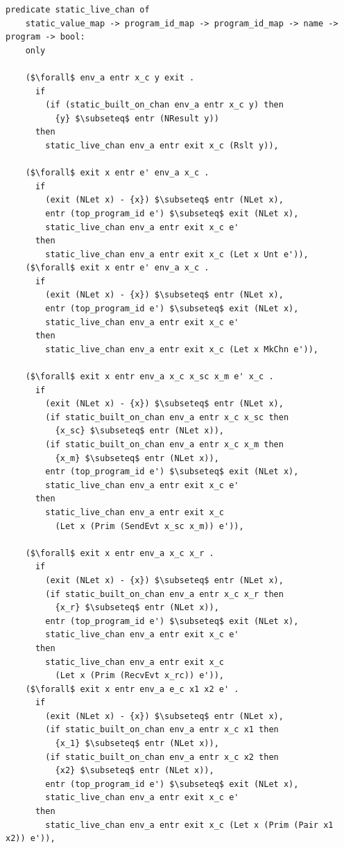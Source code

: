 \documentclass{article}
\begin{document}
\begin{lstlisting}[language=logic, mathescape]
  predicate static_live_chan of
    static_value_map -> program_id_map -> program_id_map -> name -> program -> bool:
    only

    ($\forall$ env_a entr x_c y exit .
      if
        (if (static_built_on_chan env_a entr x_c y) then
          {y} $\subseteq$ entr (NResult y))
      then
        static_live_chan env_a entr exit x_c (Rslt y)),

    ($\forall$ exit x entr e' env_a x_c .
      if 
        (exit (NLet x) - {x}) $\subseteq$ entr (NLet x),
        entr (top_program_id e') $\subseteq$ exit (NLet x),
        static_live_chan env_a entr exit x_c e'
      then 
        static_live_chan env_a entr exit x_c (Let x Unt e')),
    ($\forall$ exit x entr e' env_a x_c .
      if
        (exit (NLet x) - {x}) $\subseteq$ entr (NLet x),
        entr (top_program_id e') $\subseteq$ exit (NLet x),
        static_live_chan env_a entr exit x_c e'
      then 
        static_live_chan env_a entr exit x_c (Let x MkChn e')),

    ($\forall$ exit x entr env_a x_c x_sc x_m e' x_c .
      if
        (exit (NLet x) - {x}) $\subseteq$ entr (NLet x),
        (if static_built_on_chan env_a entr x_c x_sc then
          {x_sc} $\subseteq$ entr (NLet x)),
        (if static_built_on_chan env_a entr x_c x_m then 
          {x_m} $\subseteq$ entr (NLet x)),
        entr (top_program_id e') $\subseteq$ exit (NLet x),
        static_live_chan env_a entr exit x_c e'
      then
        static_live_chan env_a entr exit x_c
          (Let x (Prim (SendEvt x_sc x_m)) e')),

    ($\forall$ exit x entr env_a x_c x_r .    
      if
        (exit (NLet x) - {x}) $\subseteq$ entr (NLet x),
        (if static_built_on_chan env_a entr x_c x_r then
          {x_r} $\subseteq$ entr (NLet x)),
        entr (top_program_id e') $\subseteq$ exit (NLet x),
        static_live_chan env_a entr exit x_c e'
      then
        static_live_chan env_a entr exit x_c
          (Let x (Prim (RecvEvt x_rc)) e')),
    ($\forall$ exit x entr env_a e_c x1 x2 e' .
      if
        (exit (NLet x) - {x}) $\subseteq$ entr (NLet x),
        (if static_built_on_chan env_a entr x_c x1 then
          {x_1} $\subseteq$ entr (NLet x)),
        (if static_built_on_chan env_a entr x_c x2 then
          {x2} $\subseteq$ entr (NLet x)),
        entr (top_program_id e') $\subseteq$ exit (NLet x),
        static_live_chan env_a entr exit x_c e'
      then
        static_live_chan env_a entr exit x_c (Let x (Prim (Pair x1 x2)) e')),


\end{lstlisting}
\end{document}
